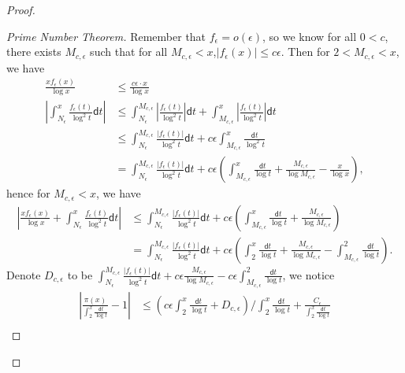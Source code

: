 \begin{proof}
\begin{proof}[Prime Number Theorem]
    Remember that $f_{\epsilon}=o\left(\epsilon\right)$, so we know for
    all $0<c$, there exists $M_{c,\epsilon}$ such that for all $M_{c,\epsilon}<x$,$\left|f_{\epsilon}\left(x\right)\right|\le c\epsilon$.
    Then for $2<M_{c,\epsilon}<x$, we have
    \[
    \begin{aligned}\frac{xf_{\epsilon}\left(x\right)}{\log x} & \le\frac{c\epsilon\cdot x}{\log x}\\
    \left|\int_{N_{\epsilon}}^{x}\frac{f_{\epsilon}\left(t\right)}{\log^{2}t}\mathsf{d}t\right| & \le\int_{N_{\epsilon}}^{M_{c,\epsilon}}\left|\frac{f_{\epsilon}\left(t\right)}{\log^{2}t}\right|\mathsf{d}t+\int_{M_{c,\epsilon}}^{x}\left|\frac{f_{\epsilon}\left(t\right)}{\log^{2}t}\right|\mathsf{d}t\\
     & \le\int_{N_{\epsilon}}^{M_{c,\epsilon}}\frac{\left|f_{\epsilon}\left(t\right)\right|}{\log^{2}t}\mathsf{d}t+c\epsilon\int_{M_{c,\epsilon}}^{x}\frac{\mathsf{d}t}{\log^{2}t}\\
     & =\int_{N_{\epsilon}}^{M_{c,\epsilon}}\frac{\left|f_{\epsilon}\left(t\right)\right|}{\log^{2}t}\mathsf{d}t+c\epsilon\left(\int_{M_{c,\epsilon}}^{x}\frac{\mathsf{d}t}{\log t}+\frac{M_{c,\epsilon}}{\log M_{c,\epsilon}}-\frac{x}{\log x}\right),
    \end{aligned}
    \]
    hence for $M_{c,\epsilon}<x$, we have
    \[
    \begin{aligned}\left|\frac{xf_{\epsilon}\left(x\right)}{\log x}+\int_{N_{\epsilon}}^{x}\frac{f_{\epsilon}\left(t\right)}{\log^{2}t}\mathsf{d}t\right| & \le\int_{N_{\epsilon}}^{M_{c,\epsilon}}\frac{\left|f_{\epsilon}\left(t\right)\right|}{\log^{2}t}\mathsf{d}t+c\epsilon\left(\int_{M_{c,\epsilon}}^{x}\frac{\mathsf{d}t}{\log t}+\frac{M_{c,\epsilon}}{\log M_{c,\epsilon}}\right)\\
     & =\int_{N_{\epsilon}}^{M_{c,\epsilon}}\frac{\left|f_{\epsilon}\left(t\right)\right|}{\log^{2}t}\mathsf{d}t+c\epsilon\left(\int_{2}^{x}\frac{\mathsf{d}t}{\log t}+\frac{M_{c,\epsilon}}{\log M_{c,\epsilon}}-\int_{M_{c,\epsilon}}^{2}\frac{\mathsf{d}t}{\log t}\right).
    \end{aligned}
    \]
    Denote $D_{c,\epsilon}$ to be $\int_{N_{\epsilon}}^{M_{c,\epsilon}}\frac{\left|f_{\epsilon}\left(t\right)\right|}{\log^{2}t}\mathsf{d}t+c\epsilon\frac{M_{c,\epsilon}}{\log M_{c,\epsilon}}-c\epsilon\int_{M_{c,\epsilon}}^{2}\frac{\mathsf{d}t}{\log t}$, we notice
    \[
    \begin{aligned}\left|\frac{\pi\left(x\right)}{\int_{2}^{x}\frac{\mathsf{d}t}{\log t}}-1\right| & \le\left(c\epsilon\int_{2}^{x}\frac{\mathsf{d}t}{\log t}+D_{c,\epsilon}\right)/\int_{2}^{x}\frac{\mathsf{d}t}{\log t}+\frac{C_{\epsilon}}{\int_{2}^{x}\frac{\mathsf{d}t}{\log t}}\\

\end{aligned}\]
\end{proof}
\end{proof}
